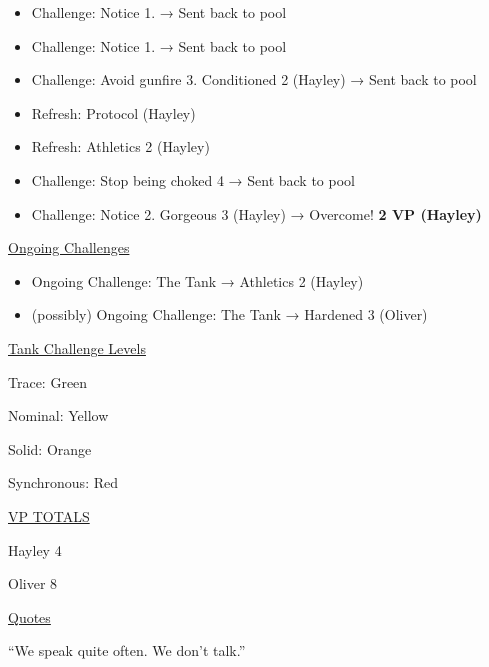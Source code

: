 \begin{itemize}
\item Challenge: Notice 1.  → Sent back to pool
\item Challenge: Notice 1.  → Sent back to pool
\end{itemize}

\begin{itemize}
\item Challenge: Avoid gunfire 3. Conditioned 2 (Hayley) → Sent back to pool
\item Refresh: Protocol (Hayley)
\item Refresh: Athletics 2 (Hayley)
\item Challenge: Stop being choked 4 → Sent back to pool
\item Challenge: Notice 2. Gorgeous 3 (Hayley) → Overcome! \textbf{2 VP (Hayley)} 
\end{itemize}



\underline{  {\LARGE Ongoing Challenges }  }

\begin{itemize}
\item Ongoing Challenge: The Tank → Athletics 2 (Hayley)
\item (possibly) Ongoing Challenge: The Tank → Hardened 3 (Oliver)
\end{itemize}



\underline{  {\LARGE Tank Challenge Levels }  }

Trace: Green

Nominal: Yellow

Solid: Orange

Synchronous: Red



\underline{  {\LARGE VP TOTALS }  }

Hayley 4

Oliver 8



\underline{  {\LARGE Quotes }  }





``We speak quite often.  We don't talk.''





